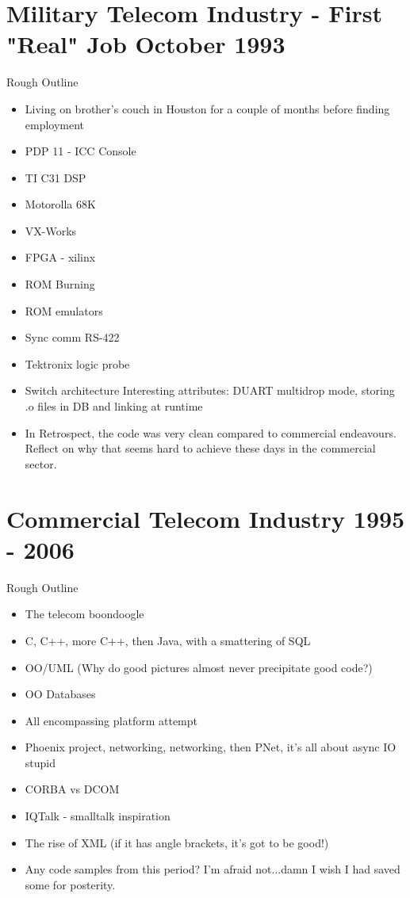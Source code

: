 \documentclass[12pt]{report}
\begin{document}
\section{Military Telecom Industry - First "Real" Job October 1993}
	Rough Outline
	\begin{itemize}
	\item Living on brother's couch in Houston for a couple of
          months before finding employment

	\item PDP 11 - ICC Console
	\item TI C31 DSP
	\item Motorolla 68K
	\item VX-Works
	\item FPGA - xilinx
	\item ROM Burning
	\item ROM emulators
	\item Sync comm RS-422
	\item Tektronix logic probe
	\item Switch architecture Interesting attributes: DUART
          multidrop mode, storing .o files in DB and linking at
          runtime
          \item In Retrospect, the code was very clean compared
            to commercial endeavours. Reflect on why that seems hard
            to achieve these days in the commercial sector.
	\end{itemize}

\section{Commercial Telecom Industry 1995 - 2006}
	Rough Outline
	\begin{itemize}
	\item The telecom boondoogle
	\item C, C++, more C++, then Java, with a smattering of SQL
	\item OO/UML (Why do good pictures almost never precipitate
          good code?)
        \item OO Databases
	\item All encompassing platform attempt
	\item Phoenix project, networking, networking, then PNet, it's all about async IO stupid
	\item CORBA vs DCOM
	\item IQTalk - smalltalk inspiration
	\item The rise of XML (if it has angle brackets, it's got to be good!)
	\item Any code samples from this period? 
          I'm afraid not...damn I wish I had saved some for posterity.
	\end{itemize}
\end{document}
